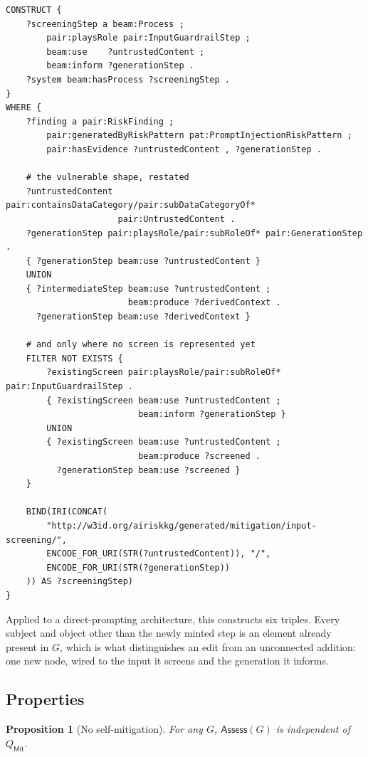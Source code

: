\documentclass[11pt,a4paper]{article}
\theoremstyle{definition}
\theoremstyle{plain}
\newtheorem{proposition}{Proposition}
\newcommand{\Arch}{G}
\newcommand{\Assess}{\mathsf{Assess}}
\begin{document}
\begin{lstlisting}
CONSTRUCT {
    ?screeningStep a beam:Process ;
        pair:playsRole pair:InputGuardrailStep ;
        beam:use    ?untrustedContent ;
        beam:inform ?generationStep .
    ?system beam:hasProcess ?screeningStep .
}
WHERE {
    ?finding a pair:RiskFinding ;
        pair:generatedByRiskPattern pat:PromptInjectionRiskPattern ;
        pair:hasEvidence ?untrustedContent , ?generationStep .

    # the vulnerable shape, restated
    ?untrustedContent pair:containsDataCategory/pair:subDataCategoryOf*
                      pair:UntrustedContent .
    ?generationStep pair:playsRole/pair:subRoleOf* pair:GenerationStep .
    { ?generationStep beam:use ?untrustedContent }
    UNION
    { ?intermediateStep beam:use ?untrustedContent ;
                        beam:produce ?derivedContext .
      ?generationStep beam:use ?derivedContext }

    # and only where no screen is represented yet
    FILTER NOT EXISTS {
        ?existingScreen pair:playsRole/pair:subRoleOf* pair:InputGuardrailStep .
        { ?existingScreen beam:use ?untrustedContent ;
                          beam:inform ?generationStep }
        UNION
        { ?existingScreen beam:use ?untrustedContent ;
                          beam:produce ?screened .
          ?generationStep beam:use ?screened }
    }

    BIND(IRI(CONCAT(
        "http://w3id.org/airiskkg/generated/mitigation/input-screening/",
        ENCODE_FOR_URI(STR(?untrustedContent)), "/",
        ENCODE_FOR_URI(STR(?generationStep))
    )) AS ?screeningStep)
}
\end{lstlisting}

Applied to a direct-prompting architecture, this constructs six triples. Every
subject and object other than the newly minted step is an element already
present in $\Arch$, which is what distinguishes an edit from an unconnected
addition: one new node, wired to the input it screens and the generation it
informs.

\subsection{Properties}

\begin{proposition}[No self-mitigation]
\label{prop:no-self-mitigation}
For any $\Arch$, $\Assess(\Arch)$ is independent of $Q_{\mathsf{Mit}}$.
\end{proposition}
\end{document}
